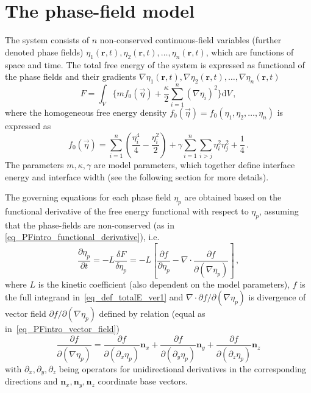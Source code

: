 \section{The phase-field model}
The system consists of $n$ non-conserved continuous-field variables (further denoted phase fields) $\eta_1(\mathbf{r},t), \eta_2(\mathbf{r},t),\dots,\eta_n(\mathbf{r},t)$, which are functions of space and time. The total free energy of the system is expressed as functional of the phase fields and their gradients $\nabla\eta_1(\mathbf{r},t), \nabla\eta_2(\mathbf{r},t),\dots,\nabla\eta_n(\mathbf{r},t)$
\begin{equation} \label{eq_def_totalE_ver1}
	F = \int_V \Bigg\{ m f_0(\vec{\eta}) + \frac{\kappa}{2}\sum_{i=1}^n(\nabla \eta_i)^2 \Bigg\} \mathrm{d}V \,,
\end{equation}
where the homogeneous free energy density $f_0(\vec{\eta}) = f_0(\eta_1, \eta_2,\dots,\eta_n)$ is expressed as 
\begin{equation}
	f_0(\vec{\eta}) = \sum_{i=1}^n\left(\frac{\eta_i^4}{4} - \frac{\eta_i^2}{2} \right) +\gamma\sum_{i=1}^n\sum_{i>j}\eta_i^2\eta_j^2 + \frac{1}{4} \,.
\end{equation}
The parameters $m,\kappa, \gamma$ are model parameters, which together define interface energy and interface width (see the following section for more details).

The governing equations for each phase field $\eta_p$ are obtained based on the  functional derivative of the free energy functional with respect to $\eta_p$, assuming that the phase-fields are non-conserved (as in \eqref{eq_PFintro_functional_derivative}), i.e. %
\begin{equation}
	\label{eq_ACeq_governing}
	\frac{\partial \eta_p}{\partial t} = -L\frac{\delta F}{\delta \eta_p} = -L \left[ \frac{\partial f}{\partial \eta_p} - \nabla\cdot\frac{\partial f}{\partial(\nabla \eta_p)} \right] \,,
\end{equation}
where $L$ is the kinetic coefficient (also dependent on the model parameters), $f$ is the full integrand in~\eqref{eq_def_totalE_ver1} and $\nabla\cdot\partial f/\partial(\nabla \eta_p)$ is divergence of vector field $\partial f/\partial(\nabla \eta_p)$ defined by relation (equal as in~\eqref{eq_PFintro_vector_field})
\begin{equation}
	\frac{\partial f}{\partial(\nabla \eta_p)} = \frac{\partial f}{\partial(\partial_x\eta_p)}\mathbf{n}_x + \frac{\partial f}{\partial(\partial_y \eta_p)}\mathbf{n}_y + \frac{\partial f}{\partial(\partial_z \eta_p)}\mathbf{n}_z
\end{equation}
with $\partial_x,\partial_y,\partial_z$ being operators for unidirectional derivatives in the corresponding directions and $\mathbf{n}_x,\mathbf{n}_y,\mathbf{n}_z$ coordinate base vectors. 


